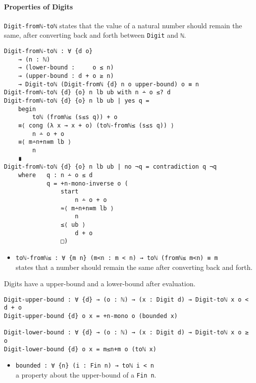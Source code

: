 \documentclass[../thesis.tex]{subfiles}
\begin{document}
\paragraph{Properties of Digits}
{\lstinline|Digit-fromℕ-toℕ|} states that the value of a natural number should
remain the same, after converting back and forth between {\lstinline|Digit|} and
{\lstinline|ℕ|}.

\begin{lstlisting}
Digit-fromℕ-toℕ : ∀ {d o}
    → (n : ℕ)
    → (lower-bound :     o ≤ n)
    → (upper-bound : d + o ≥ n)
    → Digit-toℕ (Digit-fromℕ {d} n o upper-bound) o ≡ n
Digit-fromℕ-toℕ {d} {o} n lb ub with n ∸ o ≤? d
Digit-fromℕ-toℕ {d} {o} n lb ub | yes q =
    begin
        toℕ (fromℕ≤ (s≤s q)) + o
    ≡⟨ cong (λ x → x + o) (toℕ-fromℕ≤ (s≤s q)) ⟩
        n ∸ o + o
    ≡⟨ m∸n+n≡m lb ⟩
        n
    ∎
Digit-fromℕ-toℕ {d} {o} n lb ub | no ¬q = contradiction q ¬q
    where   q : n ∸ o ≤ d
            q = +n-mono-inverse o (
                start
                    n ∸ o + o
                ≈⟨ m∸n+n≡m lb ⟩
                    n
                ≤⟨ ub ⟩
                    d + o
                □)
\end{lstlisting}

\begin{itemize}
    \item {\lstinline|toℕ-fromℕ≤ : ∀ {m n} (m<n : m < n) → toℕ (fromℕ≤ m<n) ≡ m|}
        \\ states that a number should remain the same after converting back and forth.
\end{itemize}

Digits have a upper-bound and a lower-bound after evaluation.

\begin{lstlisting}[basicstyle=\ttfamily\scriptsize]
Digit-upper-bound : ∀ {d} → (o : ℕ) → (x : Digit d) → Digit-toℕ x o < d + o
Digit-upper-bound {d} o x = +n-mono o (bounded x)

Digit-lower-bound : ∀ {d} → (o : ℕ) → (x : Digit d) → Digit-toℕ x o ≥ o
Digit-lower-bound {d} o x = m≤n+m o (toℕ x)
\end{lstlisting}

\begin{itemize}
    \item {\lstinline|bounded : ∀ {n} (i : Fin n) → toℕ i < n|}
        \\ a property about the upper-bound of a {\lstinline|Fin n|}.
\end{itemize}
\end{document}
